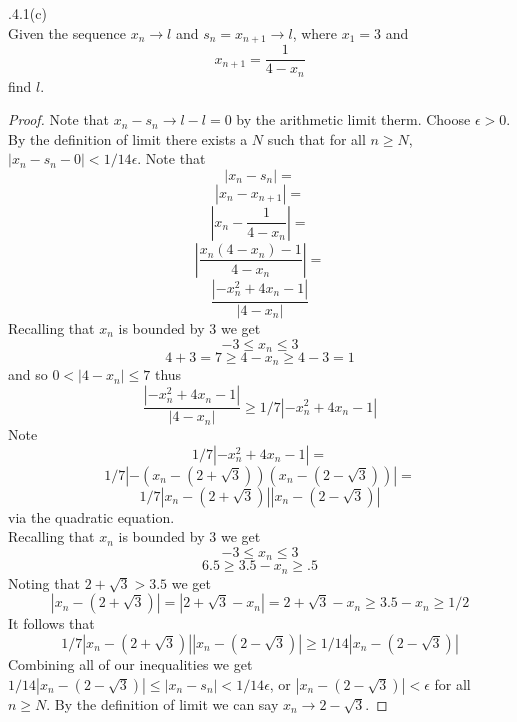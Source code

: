 \documentclass[12pt]{article}
\makeatletter
\theoremstyle{homework}
\newenvironment{exercise}[1]
{\def\@currentlabel{#1}\exercisecore}
{\endexercisecore}
\makeatother
\begin{document}
\begin{exercise}

2.4.1(c)\\
Given the sequence $x_n\rightarrow l$ and $s_n=x_{n+1}\rightarrow l$, where $x_1=3$ and
$$x_{n+1}=\frac{1}{4-x_n}
$$
find $l$.
\end{exercise}
\begin{proof}
Note that $x_n-s_n\rightarrow l-l = 0$ by the arithmetic limit therm.  Choose $\epsilon>0$.  By the definition of limit there exists a $N$ such that for all $n\geq N$, $|x_n-s_n-0|<1/14\epsilon$.  Note that
$$|x_n-s_n|=$$
$$|x_n-x_{n+1}|=$$
$$|x_n-\frac{1}{4-x_n}|=$$
$$|\frac{x_n(4-x_n)-1}{4-x_n}|=$$
$$\frac{|-x_n^2+4x_n-1|}{|4-x_n|}$$
Recalling that $x_n$ is bounded by $3$ we get 
$$-3\leq x_n\leq 3$$
$$4+3=7\geq 4-x_n\geq 4-3=1$$
and so $0<|4-x_n|\leq 7$ thus
$$\frac{|-x_n^2+4x_n-1|}{|4-x_n|}\geq 1/7|-x_n^2+4x_n-1|$$
Note
$$1/7|-x_n^2+4x_n-1|=$$
$$1/7|-(x_n-(2+\sqrt{3}))(x_n-(2-\sqrt{3}))|=$$
$$1/7|x_n-(2+\sqrt{3})||x_n-(2-\sqrt{3})|$$
via the quadratic equation.\\
Recalling that $x_n$ is bounded by $3$ we get
$$-3\leq x_n\leq 3$$
$$6.5\geq 3.5-x_n\geq .5$$
Noting that $2+\sqrt{3}>3.5$ we get
$$|x_n-(2+\sqrt{3})|=|2+\sqrt{3}-x_n|=2+\sqrt{3}-x_n\geq 3.5-x_n\geq 1/2$$
It follows that
$$1/7|x_n-(2+\sqrt{3})||x_n-(2-\sqrt{3})|\geq 1/14|x_n-(2-\sqrt{3})|$$
Combining all of our inequalities we get $1/14 |x_n-(2-\sqrt{3} )|\leq |x_n-s_n|< 1/14\epsilon$, or $|x_n-(2-\sqrt{3})|< \epsilon$ for all $n\geq N$.  By the definition of limit we can say $x_n\rightarrow 2-\sqrt{3}$.
\end{proof}
\end{document}
